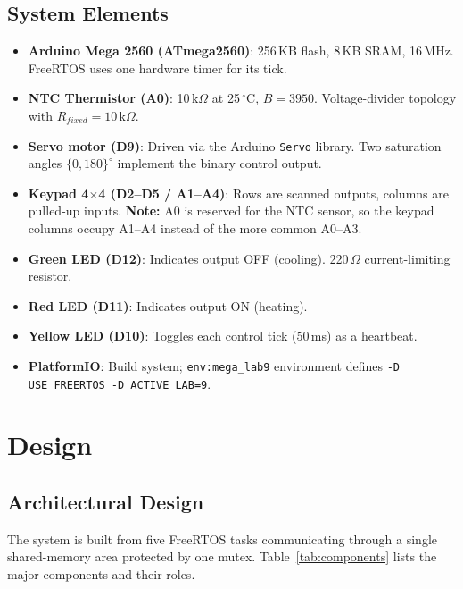 \documentclass[12pt]{article}
\begin{document}
\subsection{System Elements}

\begin{itemize}
  \item \textbf{Arduino Mega 2560 (ATmega2560)}: 256\,KB flash, 8\,KB SRAM, 16\,MHz. FreeRTOS uses one hardware timer for its tick.
  \item \textbf{NTC Thermistor (A0)}: 10\,k$\Omega$ at 25\,$^{\circ}$C, $B = 3950$. Voltage-divider topology with $R_{fixed} = 10$\,k$\Omega$.
  \item \textbf{Servo motor (D9)}: Driven via the Arduino \texttt{Servo} library. Two saturation angles $\{0, 180\}^{\circ}$ implement the binary control output.
  \item \textbf{Keypad 4$\times$4 (D2--D5 / A1--A4)}: Rows are scanned outputs, columns are pulled-up inputs. \textbf{Note:} A0 is reserved for the NTC sensor, so the keypad columns occupy A1--A4 instead of the more common A0--A3.
  \item \textbf{Green LED (D12)}: Indicates output OFF (cooling). 220\,$\Omega$ current-limiting resistor.
  \item \textbf{Red LED (D11)}: Indicates output ON (heating).
  \item \textbf{Yellow LED (D10)}: Toggles each control tick (50\,ms) as a heartbeat.
  \item \textbf{PlatformIO}: Build system; \texttt{env:mega\_lab9} environment defines \texttt{-D USE\_FREERTOS -D ACTIVE\_LAB=9}. \cite{pio}
\end{itemize}

\section{Design}

\subsection{Architectural Design}

The system is built from five FreeRTOS tasks communicating through a single shared-memory area protected by one mutex. Table~\ref{tab:components} lists the major components and their roles.
\end{document}
